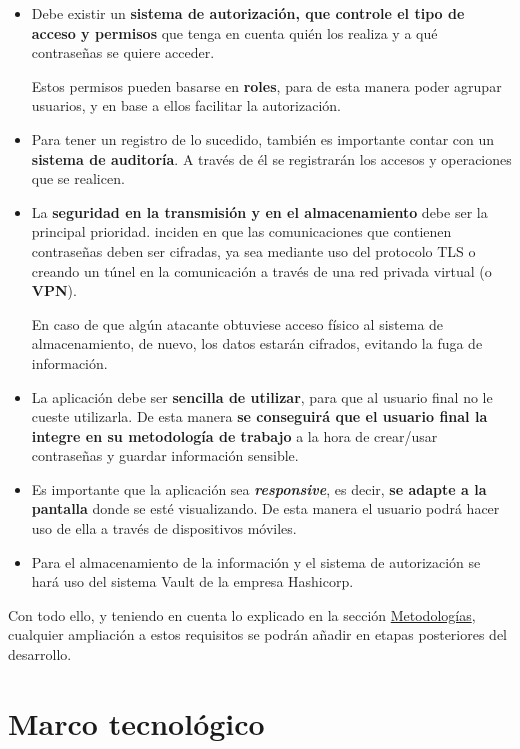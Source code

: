 \documentclass{\ClassPath/viu-tfm-template}
\begin{document}
\begin{itemize}
    \item Debe existir un \textbf{sistema de autorización, que controle el tipo de acceso y permisos} que tenga en cuenta quién los realiza y a qué contraseñas se quiere acceder.

    Estos permisos pueden basarse en \textbf{roles}, para de esta manera poder agrupar usuarios, y en base a ellos facilitar la autorización.

    \item Para tener un registro de lo sucedido, también es importante contar con un \textbf{sistema de auditoría}. A través de él se registrarán los accesos y operaciones que se realicen.

    \item La \textbf{seguridad en la transmisión y en el almacenamiento} debe ser la principal prioridad.  \textcite{scarfone2009guide} inciden en que las comunicaciones que contienen contraseñas deben ser cifradas, ya sea mediante uso del protocolo TLS o creando un túnel en la comunicación a través de una red privada virtual (o \textbf{VPN}).

    En caso de que algún atacante obtuviese acceso físico al sistema de almacenamiento, de nuevo, los datos estarán cifrados, evitando la fuga de información.

    \item La aplicación debe ser \textbf{sencilla de utilizar}, para que al usuario final no le cueste utilizarla. De esta manera \textbf{se conseguirá que el usuario final la integre en su metodología de trabajo} a la hora de crear/usar contraseñas y guardar información sensible.

    \item Es importante que la aplicación sea \textit{\textbf{responsive}}, es decir, \textbf{se adapte a la pantalla} donde se esté visualizando. De esta manera el usuario podrá hacer uso de ella a través de dispositivos móviles.

    \item Para el almacenamiento de la información y el sistema de autorización se hará uso del sistema Vault de la empresa Hashicorp.
\end{itemize}


Con todo ello, y teniendo en cuenta lo explicado en la sección \hyperlink{metodologias}{Metodologías}, cualquier ampliación a estos requisitos se podrán añadir en etapas posteriores del desarrollo.


\chapter{Marco tecnológico}
\end{document}
